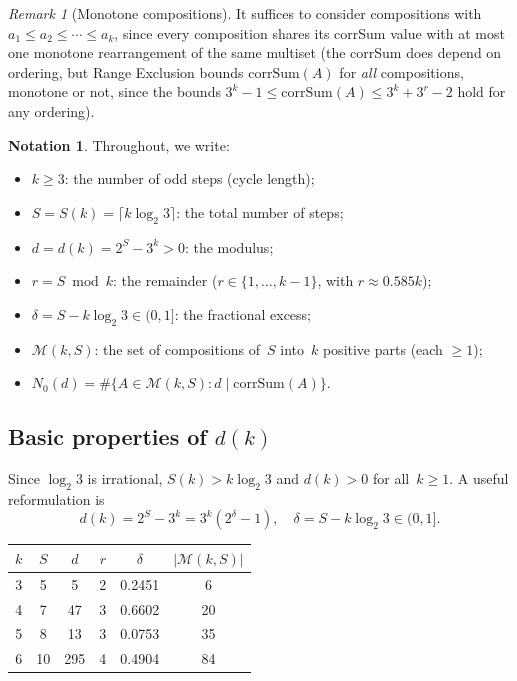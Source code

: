 \documentclass[11pt, a4paper]{amsart}
\theoremstyle{plain}
\theoremstyle{definition}
\newtheorem{notation}[theorem]{Notation}
\theoremstyle{remark}
\newtheorem{remark}[theorem]{Remark}
\newcommand{\corrSum}{\mathrm{corrSum}}
\newcommand{\Mono}{\mathcal{M}}
\begin{document}
\begin{remark}[Monotone compositions]\label{rem:monotone}
  It suffices to consider compositions with
  $a_1 \leq a_2 \leq \cdots \leq a_k$, since every
  composition shares its corrSum value with at most one
  monotone rearrangement of the same multiset (the corrSum
  does depend on ordering, but Range Exclusion bounds
  $\corrSum(A)$ for \emph{all} compositions, monotone or
  not, since the bounds $3^k - 1 \leq \corrSum(A) \leq
  3^k + 3^r - 2$ hold for any ordering).
\end{remark}

\begin{notation}\label{not:main}
Throughout, we write:
\begin{itemize}
  \item $k \geq 3$: the number of odd steps (cycle length);
  \item $S = S(k) = \lceil k \log_2 3 \rceil$: the total
        number of steps;
  \item $d = d(k) = 2^S - 3^k > 0$: the modulus;
  \item $r = S \bmod k$: the remainder
        ($r \in \{1, \ldots, k-1\}$, with $r \approx 0.585k$);
  \item $\delta = S - k\log_2 3 \in (0, 1]$:
        the fractional excess;
  \item $\Mono(k, S)$: the set of compositions of~$S$
        into~$k$ positive parts (each $\geq 1$);
  \item $N_0(d) = \#\{A \in \Mono(k,S) : d \mid \corrSum(A)\}$.
\end{itemize}
\end{notation}

\subsection{Basic properties of $d(k)$}\label{ssec:d-properties}

Since $\log_2 3$ is irrational, $S(k) > k \log_2 3$ and
$d(k) > 0$ for all~$k \geq 1$.
A useful reformulation is
\begin{equation}\label{eq:d-delta}
  d(k) = 2^S - 3^k = 3^k(2^\delta - 1),
  \quad \delta = S - k\log_2 3 \in (0, 1].
\end{equation}

\begin{center}
\begin{tabular}{cccccc}
\toprule
$k$ & $S$ & $d$ & $r$ & $\delta$ & $|\Mono(k,S)|$ \\
\midrule
3 & 5 & 5  & 2 & 0.2451 & 6 \\
4 & 7 & 47 & 3 & 0.6602 & 20 \\
5 & 8 & 13 & 3 & 0.0753 & 35 \\
6 & 10 & 295 & 4 & 0.4904 & 84 \\
\bottomrule
\end{tabular}
\end{center}
\end{document}
